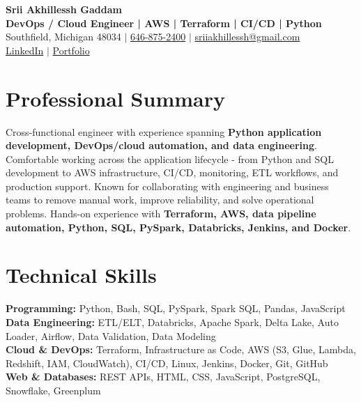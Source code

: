 \documentclass[letterpaper,10pt]{article}
\begin{document}
\fontsize{9.35pt}{10.45pt}\selectfont

\begin{center}
    {\LARGE \textbf{Srii Akhillessh Gaddam}} \\[-1pt]
    \textbf{DevOps / Cloud Engineer | AWS | Terraform | CI/CD | Python} \\[2pt]
    Southfield, Michigan 48034 $|$
    \href{tel:6468752400}{646-875-2400} $|$
    \href{mailto:sriiakhillessh@gmail.com}{sriiakhillessh@gmail.com} \\[1pt]
    \href{https://www.linkedin.com/in/srii-akhiilessh-gaddam-b48668191/}{LinkedIn} $|$
    \href{https://sriiakhillesshg.github.io/portfolio/}{Portfolio}
\end{center}
\vspace{-8pt}

\section{Professional Summary}
\small{Cross-functional engineer with experience spanning \textbf{Python application development, DevOps/cloud automation, and data engineering}. Comfortable working across the application lifecycle - from Python and SQL development to AWS infrastructure, CI/CD, monitoring, ETL workflows, and production support. Known for collaborating with engineering and business teams to remove manual work, improve reliability, and solve operational problems. Hands-on experience with \textbf{Terraform, AWS, data pipeline automation, Python, SQL, PySpark, Databricks, Jenkins, and Docker}.}

\section{Technical Skills}
\small{
\textbf{Programming:} Python, Bash, SQL, PySpark, Spark SQL, Pandas, JavaScript \\
\textbf{Data Engineering:} ETL/ELT, Databricks, Apache Spark, Delta Lake, Auto Loader, Airflow, Data Validation, Data Modeling \\
\textbf{Cloud \& DevOps:} Terraform, Infrastructure as Code, AWS (S3, Glue, Lambda, Redshift, IAM, CloudWatch), CI/CD, Linux, Jenkins, Docker, Git, GitHub \\
\textbf{Web \& Databases:} REST APIs, HTML, CSS, JavaScript, PostgreSQL, Snowflake, Greenplum
}
\end{document}
